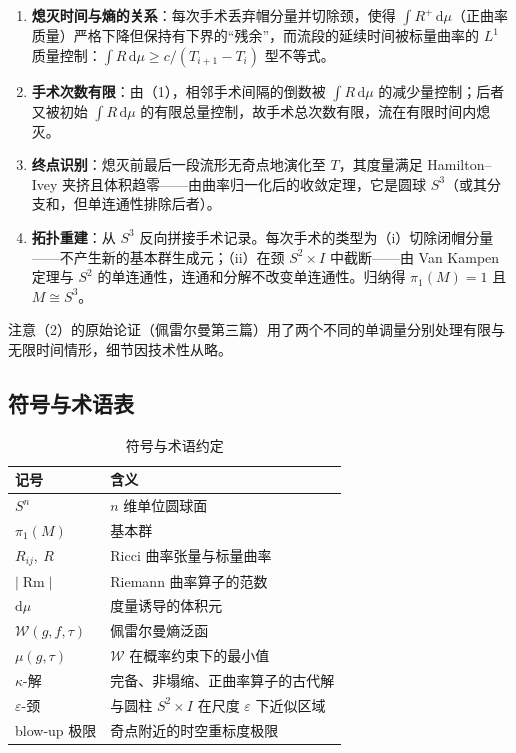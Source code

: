 \begin{enumerate}[label=(\arabic*)]
    \item \textbf{熄灭时间与熵的关系}：每次手术丢弃帽分量并切除颈，使得 $\int R^+ \,\mathrm{d}\mu$（正曲率质量）严格下降但保持有下界的“残余”，而流段的延续时间被标量曲率的 $L^1$ 质量控制：$\int R\,\mathrm{d}\mu \geq c / (T_{i+1} - T_i)$ 型不等式。
    \item \textbf{手术次数有限}：由（1），相邻手术间隔的倒数被 $\int R\,\mathrm{d}\mu$ 的减少量控制；后者又被初始 $\int R\,\mathrm{d}\mu$ 的有限总量控制，故手术总次数有限，流在有限时间内熄灭。
    \item \textbf{终点识别}：熄灭前最后一段流形无奇点地演化至 $T$，其度量满足 Hamilton--Ivey 夹挤且体积趋零——由曲率归一化后的收敛定理，它是圆球 $S^3$（或其分支和，但单连通性排除后者）。
    \item \textbf{拓扑重建}：从 $S^3$ 反向拼接手术记录。每次手术的类型为（i）切除闭帽分量——不产生新的基本群生成元；（ii）在颈 $S^2 \times I$ 中截断——由 Van Kampen 定理与 $S^2$ 的单连通性，连通和分解不改变单连通性。归纳得 $\pi_1(M) = 1$ 且 $M \cong S^3$。
\end{enumerate}

注意（2）的原始论证（佩雷尔曼第三篇\cite{perelman2003extinction}）用了两个不同的单调量分别处理有限与无限时间情形，细节因技术性从略。

\subsection{符号与术语表}

\begin{table}[htbp]
    \centering
    \caption{符号与术语约定}
    \label{tab:notation}
    \begin{tabular}{ll}
        \toprule
        记号 & 含义 \\
        \midrule
        $S^n$ & $n$ 维单位圆球面 \\
        $\pi_1(M)$ & 基本群 \\
        $R_{ij},\ R$ & Ricci 曲率张量与标量曲率 \\
        $|\operatorname{Rm}|$ & Riemann 曲率算子的范数 \\
        $\mathrm{d}\mu$ & 度量诱导的体积元 \\
        $\mathcal{W}(g,f,\tau)$ & 佩雷尔曼熵泛函 \\
        $\mu(g,\tau)$ & $\mathcal{W}$ 在概率约束下的最小值 \\
        $\kappa$-解 & 完备、非塌缩、正曲率算子的古代解 \\
        $\varepsilon$-颈 & 与圆柱 $S^2 \times I$ 在尺度 $\varepsilon$ 下近似区域 \\
        blow-up 极限 & 奇点附近的时空重标度极限 \\
        \bottomrule
    \end{tabular}
\end{table}
